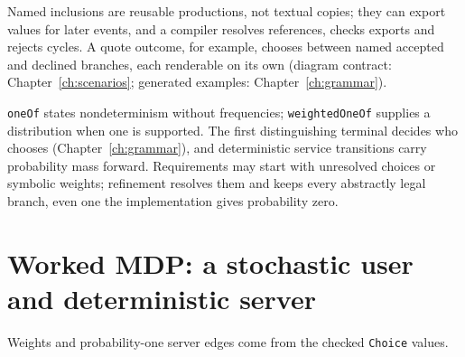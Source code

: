 Named inclusions are reusable productions, not textual copies; they can export
values for later events, and a compiler resolves references, checks exports and
rejects cycles. A quote outcome, for example, chooses between named accepted and
declined branches, each renderable on its own (diagram contract:
Chapter~\ref{ch:scenarios}; generated examples: Chapter~\ref{ch:grammar}).

\texttt{oneOf} states nondeterminism without frequencies; \texttt{weightedOneOf}
supplies a distribution when one is supported. The first distinguishing terminal
decides who chooses (Chapter~\ref{ch:grammar}), and deterministic service
transitions carry probability mass forward. Requirements may start with unresolved
choices or symbolic weights; refinement resolves them and keeps every abstractly
legal branch, even one the implementation gives probability zero.

\section{Worked MDP: a stochastic user and deterministic server}

\begin{center}
\end{center}

Weights and probability-one server edges come from the checked
\texttt{Choice} values.

\begin{center}
\end{center}

